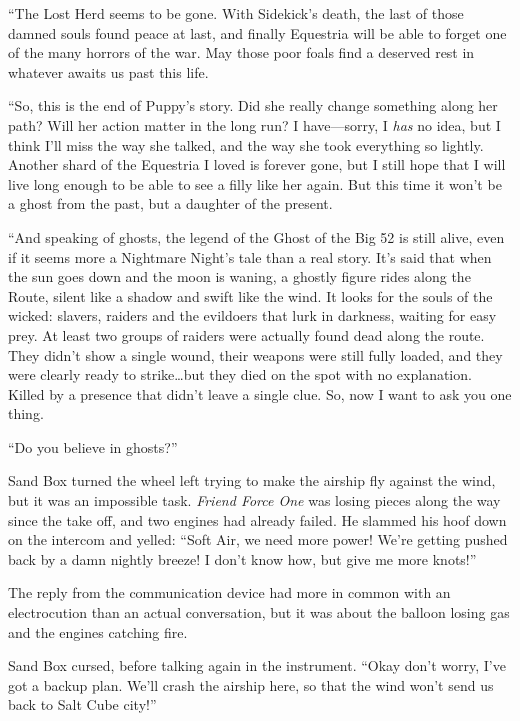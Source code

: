{``The Lost Herd seems to be gone. With Sidekick's death, the last of those damned souls found peace at last, and finally Equestria will be able to forget one of the many horrors of the war. May those poor foals find a deserved rest in whatever awaits us past this life.

``So, this is the end of Puppy's story. Did she really change something along her path? Will her action matter in the long run? I have---sorry, I \emph{has} no idea, but I think I'll miss the way she talked, and the way she took everything so lightly. Another shard of the Equestria I loved is forever gone, but I still hope that I will live long enough to be able to see a filly like her again. But this time it won't be a ghost from the past, but a daughter of the present.

``And speaking of ghosts, the legend of the Ghost of the Big 52 is still alive, even if it seems more a Nightmare Night's tale than a real story. It's said that when the sun goes down and the moon is waning, a ghostly figure rides along the Route, silent like a shadow and swift like the wind. It looks for the souls of the wicked: slavers, raiders and the evildoers that lurk in darkness, waiting for easy prey. At least two groups of raiders were actually found dead along the route. They didn't show a single wound, their weapons were still fully loaded, and they were clearly ready to strike\dots but they died on the spot with no explanation. Killed by a presence that didn't leave a single clue. So, now I want to ask you one thing.

``Do you believe in ghosts?''

}

\horizonline


Sand Box turned the wheel left trying to make the airship fly against the wind, but it was an impossible task. \emph{Friend Force One} was losing pieces along the way since the take off, and two engines had already failed. He slammed his hoof down on the intercom and yelled: ``Soft Air, we need more power! We're getting pushed back by a damn nightly breeze! I don't know how, but give me more knots!''

The reply from the communication device had more in common with an electrocution than an actual conversation, but it was about the balloon losing gas and the engines catching fire.

Sand Box cursed, before talking again in the instrument. ``Okay don't worry, I've got a backup plan. We'll crash the airship here, so that the wind won't send us back to Salt Cube city!''

